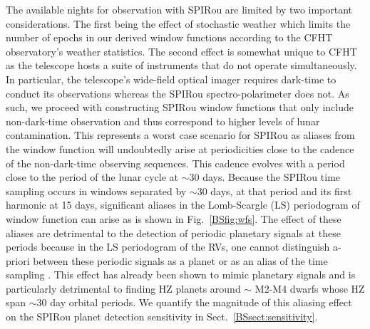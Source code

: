 The available nights for observation with SPIRou are limited by two important considerations.
The first being the effect
of stochastic weather which limits the number of epochs in our derived window functions according to the
CFHT observatory's weather statistics. The second effect is somewhat unique to CFHT as the telescope hosts
a suite of instruments that do not operate simultaneously. In particular, the telescope's wide-field
optical imager requires dark-time to conduct its observations whereas the SPIRou spectro-polarimeter
does not. As such, we proceed with constructing SPIRou window functions that only include
non-dark-time observation and thus correspond to higher levels of lunar contamination. This represents
a worst case scenario for SPIRou as aliases from the window function will undoubtedly arise at periodicities
close to the cadence of the non-dark-time observing sequences. This cadence 
evolves with a period close to the period of the lunar cycle at $\sim 30$ days.
Because the SPIRou time sampling occurs in windows separated by $\sim 30$ days,
at that period and its first harmonic at 15 days, significant aliases in the Lomb-Scargle (LS)
periodogram \citep{scargle82}
of window function can arise as is shown in Fig.~\ref{BSfig:wfs}. The effect of these aliases are
detrimental to the detection of periodic planetary signals at these periods because
in the LS periodogram of the RVs, one cannot
distinguish a-priori between these periodic signals as a planet or as an alias of the time sampling
\citep{dawson10}.
This effect has already been shown to mimic planetary signals \citep[e.g.][]{rajpaul16} and is particularly
detrimental to finding HZ planets around $\sim$ M2-M4 dwarfs whose HZ span $\sim 30$ day orbital periods.
We quantify the magnitude of this aliasing effect on the SPIRou planet detection sensitivity in
Sect.~\ref{BSsect:sensitivity}. \\

